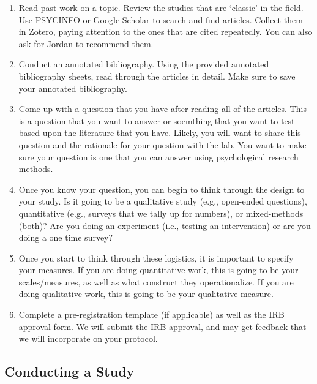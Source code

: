 \documentclass[
]{book}
\begin{document}
\begin{enumerate}
\def\labelenumi{\arabic{enumi}.}
\item
  Read past work on a topic. Review the studies that are `classic' in the field. Use PSYCINFO or Google Scholar to search and find articles. Collect them in Zotero, paying attention to the ones that are cited repeatedly. You can also ask for Jordan to recommend them.
\item
  Conduct an annotated bibliography. Using the provided annotated bibliography sheets, read through the articles in detail. Make sure to save your annotated bibliography.
\item
  Come up with a question that you have after reading all of the articles. This is a question that you want to answer or soemthing that you want to test based upon the literature that you have. Likely, you will want to share this question and the rationale for your question with the lab. You want to make sure your question is one that you can answer using psychological research methods.
\item
  Once you know your question, you can begin to think through the design to your study. Is it going to be a qualitative study (e.g., open-ended questions), quantitative (e.g., surveys that we tally up for numbers), or mixed-methods (both)? Are you doing an experiment (i.e., testing an intervention) or are you doing a one time survey?
\item
  Once you start to think through these logistics, it is important to specify your measures. If you are doing quantitative work, this is going to be your scales/measures, as well as what construct they operationalize. If you are doing qualitative work, this is going to be your qualitative measure.
\item
  Complete a pre-registration template (if applicable) as well as the IRB approval form. We will submit the IRB approval, and may get feedback that we will incorporate on your protocol.
\end{enumerate}

\hypertarget{conducting-a-study}{%
\subsection{Conducting a Study}\label{conducting-a-study}}
\end{document}
